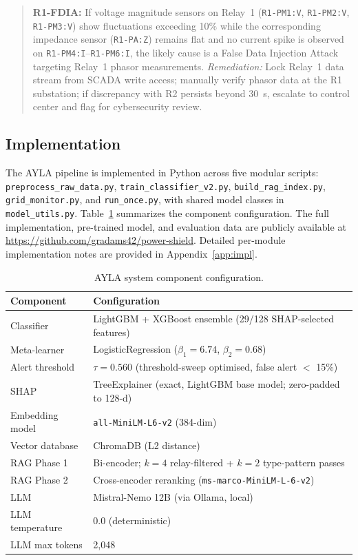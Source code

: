 \documentclass[twocolumn, 10pt, letterpaper]{article}
\begin{document}
\begin{quote}\small
\textbf{R1-FDIA:} If voltage magnitude sensors on Relay~1 (\texttt{R1-PM1:V},
\texttt{R1-PM2:V}, \texttt{R1-PM3:V}) show fluctuations exceeding 10\% while the
corresponding impedance sensor (\texttt{R1-PA:Z}) remains flat and no current spike
is observed on \texttt{R1-PM4:I}--\texttt{R1-PM6:I}, the likely cause is a False
Data Injection Attack targeting Relay~1 phasor measurements.
\textit{Remediation:} Lock Relay~1 data stream from SCADA write access; manually
verify phasor data at the R1 substation; if discrepancy with R2 persists beyond
30~s, escalate to control center and flag for cybersecurity review.
\end{quote}

\subsection{Implementation}

The AYLA pipeline is implemented in Python across five modular scripts:
\texttt{preprocess\_raw\_data.py}, \texttt{train\_classifier\_v2.py},
\texttt{build\_rag\_index.py}, \texttt{grid\_monitor.py}, and \texttt{run\_once.py},
with shared model classes in \texttt{model\_utils.py}.
Table~\ref{tab:config} summarizes the component configuration.
The full implementation, pre-trained model, and evaluation data are publicly
available at \url{https://github.com/gradams42/power-shield}.
Detailed per-module implementation notes are provided in Appendix~\ref{app:impl}.

\begin{table}[t]
\centering
\caption{AYLA system component configuration.}
\label{tab:config}
\begin{tabular}{ll}
\toprule
\textbf{Component} & \textbf{Configuration} \\
\midrule
Classifier        & LightGBM + XGBoost ensemble (29/128 SHAP-selected features) \\
Meta-learner      & LogisticRegression ($\beta_1{=}6.74$, $\beta_2{=}0.68$) \\
Alert threshold   & $\tau = 0.560$ (threshold-sweep optimised, false alert $<$ 15\%) \\
SHAP              & TreeExplainer (exact, LightGBM base model; zero-padded to 128-d) \\
Embedding model   & \texttt{all-MiniLM-L6-v2} (384-dim) \\
Vector database   & ChromaDB (L2 distance) \\
RAG Phase 1       & Bi-encoder; $k{=}4$ relay-filtered + $k{=}2$ type-pattern passes \\
RAG Phase 2       & Cross-encoder reranking (\texttt{ms-marco-MiniLM-L-6-v2}) \\
LLM               & Mistral-Nemo 12B (via Ollama, local) \\
LLM temperature   & 0.0 (deterministic) \\
LLM max tokens    & 2,048 \\
\bottomrule
\end{tabular}
\end{table}
\end{document}
